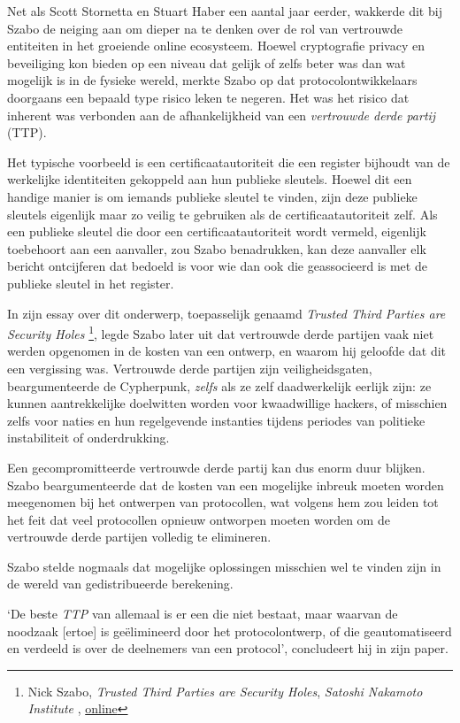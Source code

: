 \documentclass[
  a5paper,
  smalldemyvopaper,11pt,twoside,onecolumn,openright,extrafontsizes,
hidelinks]{memoir}
\begin{document}
Net als Scott Stornetta en Stuart Haber een aantal jaar eerder, wakkerde
dit bij Szabo de neiging aan om dieper na te denken over de rol van
vertrouwde entiteiten in het groeiende online ecosysteem. Hoewel
cryptografie privacy en beveiliging kon bieden op een niveau dat gelijk
of zelfs beter was dan wat mogelijk is in de fysieke wereld, merkte
Szabo op dat protocolontwikkelaars doorgaans een bepaald type risico
leken te negeren. Het was het risico dat inherent was verbonden aan de
afhankelijkheid van een \emph{vertrouwde derde partij} (TTP).

Het typische voorbeeld is een certificaatautoriteit die een register
bijhoudt van de werkelijke identiteiten gekoppeld aan hun publieke
sleutels. Hoewel dit een handige manier is om iemands publieke sleutel
te vinden, zijn deze publieke sleutels eigenlijk maar zo veilig te
gebruiken als de certificaatautoriteit zelf. Als een publieke sleutel
die door een certificaatautoriteit wordt vermeld, eigenlijk toebehoort
aan een aanvaller, zou Szabo benadrukken, kan deze aanvaller elk bericht
ontcijferen dat bedoeld is voor wie dan ook die geassocieerd is met de
publieke sleutel in het register.

In zijn essay over dit onderwerp, toepasselijk genaamd \emph{Trusted
Third Parties are Security Holes} \footnote{Nick Szabo, \emph{Trusted
  Third Parties are Security Holes}, \emph{Satoshi Nakamoto Institute} ,
  \href{https://nakamotoinstitute.org/library/trusted-third-parties/}{online}},
legde Szabo later uit dat vertrouwde derde partijen vaak niet werden
opgenomen in de kosten van een ontwerp, en waarom hij geloofde dat dit
een vergissing was. Vertrouwde derde partijen zijn veiligheidsgaten,
beargumenteerde de Cypherpunk, \emph{zelfs} als ze zelf daadwerkelijk
eerlijk zijn: ze kunnen aantrekkelijke doelwitten worden voor
kwaadwillige hackers, of misschien zelfs voor naties en hun regelgevende
instanties tijdens periodes van politieke instabiliteit of
onderdrukking.

Een gecompromitteerde vertrouwde derde partij kan dus enorm duur
blijken. Szabo beargumenteerde dat de kosten van een mogelijke inbreuk
moeten worden meegenomen bij het ontwerpen van protocollen, wat volgens
hem zou leiden tot het feit dat veel protocollen opnieuw ontworpen
moeten worden om de vertrouwde derde partijen volledig te elimineren.

Szabo stelde nogmaals dat mogelijke oplossingen misschien wel te vinden
zijn in de wereld van gedistribueerde berekening.

`De beste \emph{TTP} van allemaal is er een die niet bestaat, maar
waarvan de noodzaak {[}ertoe{]} is geëlimineerd door het
protocolontwerp, of die geautomatiseerd en verdeeld is over de
deelnemers van een protocol', concludeert hij in zijn paper.
\end{document}
